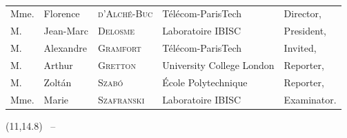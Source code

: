 \begin{titlepage}
\begin{addmargin}[-1cm]{-3cm}
\paragraph{}
\noindent \begin{tabular}{lllll}
Mme. & Florence & \textsc{d'Alch\'e-Buc} & T\'el\'ecom-ParisTech & Director, \\
M. & Jean-Marc & \textsc{Delosme} & Laboratoire IBISC & President, \\
M. & Alexandre & \textsc{Gramfort} & T\'el\'ecom-ParisTech & Invited, \\
M. & Arthur & \textsc{Gretton} & University College London & Reporter, \\
M. & Zolt\'an & \textsc{Szab\'o} & \'Ecole Polytechnique & Reporter, \\
Mme.&  Marie & \textsc{Szafranski} & Laboratoire IBISC & Examinator. \\
\end{tabular}
\vspace*{.75cm}

\begin{textblock}{5}(11,14.8)
\myTime\ -- \myVersion %
\end{textblock}


\end{addmargin}

\renewcommand*{\thefootnote}{\arabic{footnote}}
\setcounter{footnote}{0}

\DefaultMargins
\end{titlepage}
